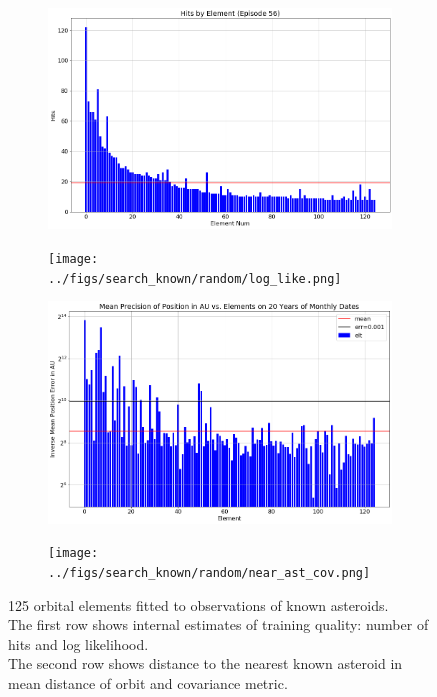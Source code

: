 \begin{figure}[h]
\begin{subfigure}[t]{\subfigwidth\textwidth}
\centering
\includegraphics[width=1.0\textwidth]{../figs/search_known/random/hits.png}
\end{subfigure}
\hfill
\begin{subfigure}[t]{\subfigwidth\textwidth}
\centering
\texttt{[image: ../figs/search\_known/random/log\_like.png]}
\end{subfigure}
\medskip
\begin{subfigure}[t]{\subfigwidth\textwidth}
\centering
\includegraphics[width=1.0\textwidth]{../figs/search_known/random/near_ast_dist.png}
\end{subfigure}
\hfill
\begin{subfigure}[t]{\subfigwidth\textwidth}
\centering
\texttt{[image: ../figs/search\_known/random/near\_ast\_cov.png]}
\end{subfigure}
\caption{125 orbital elements fitted to observations of known asteroids.\\
The first row shows internal estimates of training quality: number of hits and log likelihood.\\
The second row shows distance to the nearest known asteroid in mean distance of orbit and covariance metric.}
\label{fig:TrainRandomKnown}
\end{figure}

